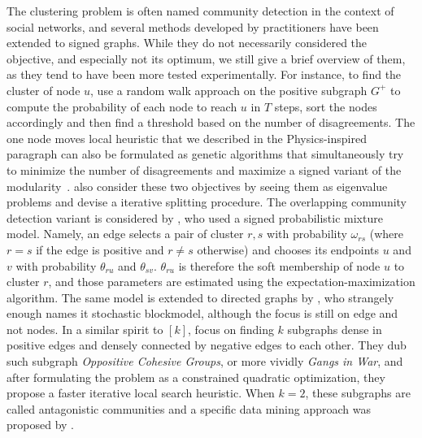 The clustering problem is often named community detection in the context of social networks, and
several methods developed by practitioners have been extended to signed graphs. While they do not
necessarily considered the \pcc{} objective, and especially not its optimum, we still give a brief
overview of them, as they tend to have been more tested experimentally. For instance, to find the
cluster of node $u$, \textcite{Yang2007} use a random walk approach on the positive subgraph $G^+$
to compute the probability of each node to reach $u$ in $T$ steps, sort the nodes accordingly and
then find a threshold  based on the number of disagreements.
The one node moves local heuristic that we described in the Physics-inspired paragraph
 can also be formulated as genetic algorithms that simultaneously try to
minimize the number of disagreements and maximize a signed variant of the
modularity~\autocites{Li2013}{Amelio2013}. \Textcite{Anchuri2012} also consider these two objectives
by seeing them as eigenvalue problems and devise a iterative splitting procedure.
The overlapping community detection variant is considered by \textcite{Chen14}, who used a signed
probabilistic mixture model. Namely, an edge selects a pair of cluster $r,s$ with probability
$\omega_{rs}$ (where $r=s$ if the edge is positive and $r\neq s$ otherwise) and chooses its endpoints
$u$ and $v$ with probability $\theta_{ru}$ and $\theta_{sv}$. $\theta_{ru}$ is therefore the soft
membership of node $u$ to cluster $r$, and those parameters are estimated using the
expectation-maximization algorithm. The same model is extended to directed graphs by
\textcite{Jiang2015}, who strangely enough names it stochastic blockmodel, although the focus is
still on edge and not nodes.
In a similar spirit to \maxa{}$[k]$, \textcite{SignedGang} focus on finding $k$ subgraphs dense in
positive edges and densely connected by negative edges to each other. They dub such subgraph
\emph{Oppositive Cohesive Groups}, or more vividly \emph{Gangs in War}, and after formulating the
problem as a constrained quadratic optimization, they propose a faster iterative local search
heuristic. When $k=2$, these subgraphs are called antagonistic communities and a specific data
mining approach was proposed by \textcite{quasiGang}.
